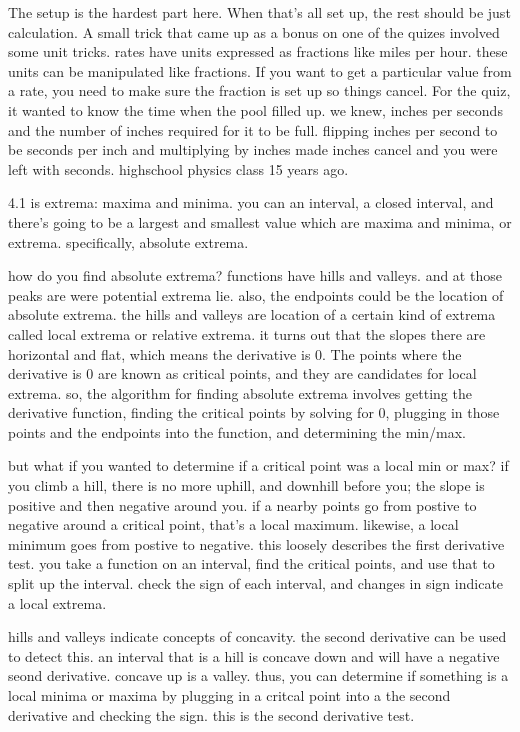The setup is the hardest part here. When that's all set up, the rest should be just calculation. A small trick that came up as a bonus on one of the quizes involved some unit tricks. rates have units expressed as fractions like miles per hour. these units can be manipulated like fractions. If you want to get a particular value from a rate, you need to make sure the fraction is set up so things cancel. For the quiz, it wanted to know the time when the pool filled up. we knew, inches per seconds and the number of inches required for it to be full. flipping inches per second to be seconds per inch and multiplying by inches made inches cancel and you were left with seconds. highschool physics class 15 years ago.
\par

4.1 is extrema: maxima and minima. you can an interval, a closed interval, and there's going to be a largest and smallest value which are maxima and minima, or extrema. specifically, absolute extrema.
\par

how do you find absolute extrema? functions have hills and valleys. and at those peaks are were potential extrema lie. also, the endpoints could be the location of absolute extrema. the hills and valleys are location of a certain kind of extrema called local extrema or relative extrema. it turns out that the slopes there are horizontal and flat, which means the derivative is 0. The points where the derivative is 0 are known as critical points, and they are candidates for local extrema. so, the algorithm for finding absolute extrema involves getting the derivative function, finding the critical points by solving for 0, plugging in those points and the endpoints into the function, and determining the min/max.
\par

but what if you wanted to determine if a critical point was a local min or max? if you climb a hill, there is no more uphill, and downhill before you; the slope is positive and then negative around you. if a nearby points go from postive to negative around a critical point, that's a local maximum. likewise, a local minimum goes from postive to negative. this loosely describes the first derivative test. you take a function on an interval, find the critical points, and use that to split up the interval. check the sign of each interval, and changes in sign indicate a local extrema.
\par

hills and valleys indicate concepts of concavity. the second derivative can be used to detect this. an interval that is a hill is concave down and will have a negative seond derivative. concave up is a valley. thus, you can determine if something is a local minima or maxima by plugging in a critcal point into a the second derivative and checking the sign. this is the second derivative test.
\par

